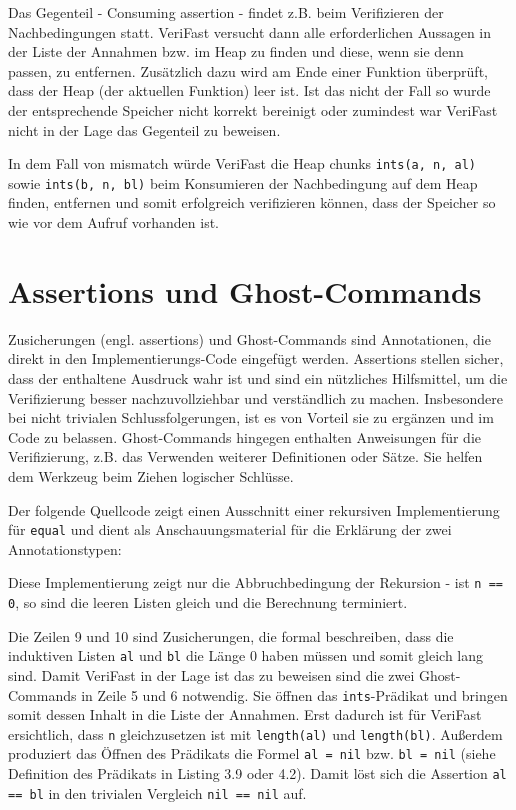 Das Gegenteil - \glqq Consuming assertion\grqq{} - findet z.B. beim Verifizieren der Nachbedingungen statt.
VeriFast versucht dann alle erforderlichen Aussagen in der Liste der Annahmen bzw. im Heap zu finden
und diese, wenn sie denn passen, zu entfernen. Zusätzlich dazu wird am Ende einer Funktion überprüft, 
dass der Heap (der aktuellen Funktion) leer ist. Ist das nicht der Fall so wurde der entsprechende Speicher 
nicht korrekt bereinigt oder zumindest war VeriFast nicht in der Lage das Gegenteil zu beweisen.

In dem Fall von mismatch würde VeriFast die Heap chunks \lstinline{ints(a, n, al)} sowie
\lstinline{ints(b, n, bl)} beim Konsumieren der Nachbedingung auf dem Heap finden, entfernen und
somit erfolgreich verifizieren können, dass der Speicher so wie vor dem Aufruf vorhanden ist.



\section{Assertions und Ghost-Commands}

Zusicherungen (engl. assertions) und Ghost-Commands sind Annotationen, die direkt in den Implementierungs-Code
eingefügt werden. Assertions stellen sicher, dass der enthaltene Ausdruck wahr ist und sind ein nützliches Hilfsmittel, 
um die Verifizierung besser nachzuvollziehbar und verständlich zu machen. Insbesondere bei 
nicht trivialen Schlussfolgerungen, ist es von Vorteil sie zu ergänzen und im Code zu belassen. Ghost-Commands hingegen 
enthalten Anweisungen für die Verifizierung, z.B. das Verwenden weiterer Definitionen oder Sätze. Sie helfen dem Werkzeug 
beim Ziehen logischer Schlüsse.

Der folgende Quellcode zeigt einen Ausschnitt einer rekursiven Implementierung für \lstinline{equal} und dient
als Anschauungsmaterial für die Erklärung der zwei Annotationstypen:



Diese Implementierung zeigt nur die Abbruchbedingung der Rekursion - ist \lstinline{n == 0}, so sind die
leeren Listen gleich und die Berechnung terminiert. 

Die Zeilen 9 und 10 sind Zusicherungen, die formal beschreiben, dass die induktiven Listen \lstinline{al} und
\lstinline{bl} die Länge 0 haben müssen und somit gleich lang sind. Damit VeriFast in der Lage ist das zu
beweisen sind die zwei Ghost-Commands in Zeile 5 und 6 notwendig. Sie öffnen das \lstinline{ints}-Prädikat
und bringen somit dessen Inhalt in die Liste der Annahmen. Erst dadurch ist für VeriFast ersichtlich, dass 
\lstinline{n} gleichzusetzen ist mit \texttt{length(al)} und \texttt{length(bl)}. Außerdem produziert
das Öffnen des Prädikats die Formel \lstinline{al = nil} bzw. \lstinline{bl = nil} (siehe Definition
des Prädikats in Listing 3.9 oder 4.2). Damit löst sich die Assertion \lstinline{al == bl} in den
trivialen Vergleich \lstinline{nil == nil} auf.

